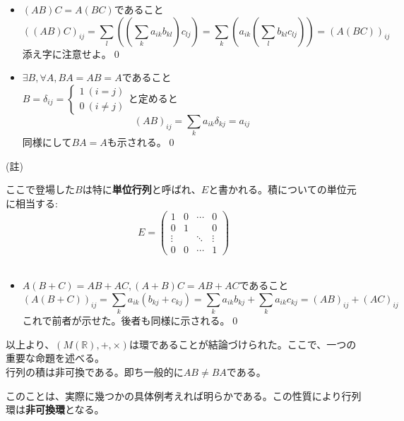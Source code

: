 \documentclass[dvipdfmx]{jsarticle}
\begin{document}
\begin{itemize}
\item $(AB)C=A(BC)$であること
\[((AB)C)_{ij}=\sum_l((\sum_ka_{ik}b_{kl})c_{lj})=\sum_k(a_{ik}(\sum_lb_{kl}c_{lj}))=(A(BC))_{ij}\]
添え字に注意せよ。\qed
\item $\exists B,\forall A,BA=AB=A$であること\\
$B=\delta_{ij}=\begin{cases}1~(i=j) \\ 0~(i \neq j)\end{cases}$と定めると
\[(AB)_{ij}=\sum_ka_{ik}\delta_{kj}=a_{ij}\]
同様にして$BA=A$も示される。\qed\par
\end{itemize}
(註)\par
ここで登場した$B$は特に\textbf{単位行列}と呼ばれ、$E$と書かれる。積についての単位元に相当する:
\[E=\begin{pmatrix}1&0&\cdots&0\\0&1&{}&0\\\vdots&{}&\ddots&\vdots\\0&0&\cdots&1\end{pmatrix}\]\\
\begin{itemize}
\item $A(B+C)=AB+AC,(A+B)C=AB+AC$であること
\[(A(B+C))_{ij}=\sum_ka_{ik}(b_{kj}+c_{kj})=\sum_ka_{ik}b_{kj}+\sum_ka_{ik}c_{kj}=(AB)_{ij}+(AC)_{ij}\]
これで前者が示せた。後者も同様に示される。\qed
\end{itemize}
以上より、$(M(\mathbb{R}),+,\times)$は環であることが結論づけられた。ここで、一つの重要な命題を述べる。\\
行列の積は非可換である。即ち一般的に$AB \neq BA$である。\\\par
このことは、実際に幾つかの具体例考えれば明らかである。この性質により行列環は\textbf{非可換環}となる。\newpage
\end{document}
